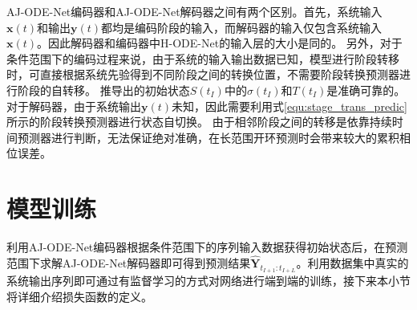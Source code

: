 
AJ-ODE-Net编码器和AJ-ODE-Net解码器之间有两个区别。首先，系统输入$\boldsymbol x(t)$和输出$\boldsymbol y(t)$都均是编码阶段的输入，而解码器的输入仅包含系统输入$\boldsymbol x(t)$。因此解码器和编码器中H-ODE-Net的输入层的大小是同的。
另外，对于条件范围下的编码过程来说，由于系统的输入输出数据已知，模型进行阶段转移时，可直接根据系统先验得到不同阶段之间的转换位置，不需要阶段转换预测器进行阶段的自转移。
推导出的初始状态$S(t_I)$中的$\sigma(t_I)$和$T(t_I)$是准确可靠的。
对于解码器，由于系统输出$\boldsymbol y(t)$未知，因此需要利用式\ref{equ:stage_trans_predic}所示的阶段转换预测器进行状态自切换。
由于相邻阶段之间的转移是依靠持续时间预测器进行判断，无法保证绝对准确，在长范围开环预测时会带来较大的累积相位误差。
\section{模型训练}
\label{sec:4_loss_function}
利用AJ-ODE-Net编码器根据条件范围下的序列输入数据获得初始状态后，在预测范围下求解AJ-ODE-Net解码器即可得到预测结果$\hat{\boldsymbol{Y}}_{t_{I+1}: t_{I+L}}$。利用数据集中真实的系统输出序列即可通过有监督学习的方式对网络进行端到端的训练，接下来本小节将详细介绍损失函数的定义。


